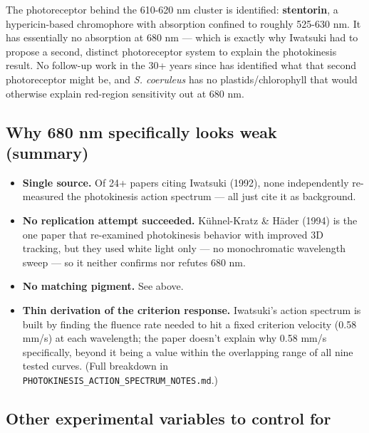 \documentclass[
]{article}
\providecommand{\tightlist}{%
  \setlength{\itemsep}{0pt}\setlength{\parskip}{0pt}}
\begin{document}
The photoreceptor behind the 610-620 nm cluster is identified:
\textbf{stentorin}, a hypericin-based chromophore with absorption
confined to roughly 525-630 nm. It has essentially no absorption at 680
nm --- which is exactly why Iwatsuki had to propose a second, distinct
photoreceptor system to explain the photokinesis result. No follow-up
work in the 30+ years since has identified what that second
photoreceptor might be, and \emph{S. coeruleus} has no
plastids/chlorophyll that would otherwise explain red-region sensitivity
out at 680 nm.

\hypertarget{why-680-nm-specifically-looks-weak-summary}{%
\subsection{Why 680 nm specifically looks weak
(summary)}\label{why-680-nm-specifically-looks-weak-summary}}

\begin{itemize}
\tightlist
\item
  \textbf{Single source.} Of 24+ papers citing Iwatsuki (1992), none
  independently re-measured the photokinesis action spectrum --- all
  just cite it as background.
\item
  \textbf{No replication attempt succeeded.} Kühnel-Kratz \& Häder
  (1994) is the one paper that re-examined photokinesis behavior with
  improved 3D tracking, but they used white light only --- no
  monochromatic wavelength sweep --- so it neither confirms nor refutes
  680 nm.
\item
  \textbf{No matching pigment.} See above.
\item
  \textbf{Thin derivation of the criterion response.} Iwatsuki's action
  spectrum is built by finding the fluence rate needed to hit a fixed
  criterion velocity (0.58 mm/s) at each wavelength; the paper doesn't
  explain why 0.58 mm/s specifically, beyond it being a value within the
  overlapping range of all nine tested curves. (Full breakdown in
  \texttt{PHOTOKINESIS\_ACTION\_SPECTRUM\_NOTES.md}.)
\end{itemize}

\hypertarget{other-experimental-variables-to-control-for}{%
\subsection{Other experimental variables to control
for}\label{other-experimental-variables-to-control-for}}
\end{document}
